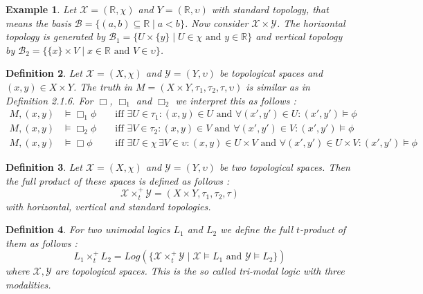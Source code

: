 \documentclass[12pt, a4paper]{scrartcl}
\newtheorem{definition}{Definition}[subsection]
\newtheorem{example}[definition]{Example}
\begin{document}
\begin{example}
    Let $\mathcal{X} = (\mathbb{R}, \chi)$ and $Y = (\mathbb{R}, \upsilon)$ with standard topology, that means the basis $\mathcal{B} = \{(a,b) \subseteq \mathbb{R} \mid a < b\}$. Now consider $\mathcal{X} \times \mathcal{Y}$. 
    The horizontal topology is generated by $\mathcal{B}_1 = \{U \times \{y\} \mid U \in \chi \mbox{ and } y \in \mathbb{R}\}$ and vertical topology by 
    $\mathcal{B}_2 = \{\{x\} \times V \mid  x \in \mathbb{R} \mbox{ and }V \in \upsilon\}$.
\end{example}

\begin{definition}
    Let $\mathcal{X} = (X, \chi)$ and $\mathcal{Y} =(Y, \upsilon)$ be topological spaces and $(x,y) \in X \times Y$. The truth in $M = (X\times Y, \tau_1,\tau_2,\tau, \upsilon)$ is similar as in Definition 2.1.6.
    For $\Box$, $\Box_1$ and $\Box_2$ we interpret this as follows : 
    \begin{align*}
        M,(x,y) &\vDash \Box_1 \phi &&\text{ iff } \exists U \in \tau_1 : (x,y) \in U \mbox{ and } \forall(x',y') \in U : (x',y') \vDash \phi \\
        M,(x,y) &\vDash \Box_2 \phi &&\text{ iff } \exists V \in \tau_2 : (x,y) \in V \mbox{ and } \forall(x',y') \in V : (x',y') \vDash \phi \\
        M,(x,y) &\vDash \Box \phi &&\text{ iff } \exists U \in \chi \, \exists V \in \upsilon: (x,y) \in U \times V \mbox{ and } \forall(x',y') \in U \times V : (x',y') \vDash \phi
    \end{align*}

\end{definition}

\begin{definition}
    Let $\mathcal{X} = (X, \chi)$ and $\mathcal{Y} = (Y, \upsilon)$ be two topological spaces. Then the full product of these spaces is defined as follows :
    $$\mathcal{X} \times^+_t \mathcal{Y} = (X \times Y, \tau_1, \tau_2, \tau)$$
    with horizontal, vertical and standard topologies.
\end{definition}



\begin{definition}
    For two unimodal logics $L_1$ and $L_2$ we define the full $t$-product of them as follows :
    $$L_1 \times^+_t L_2 = Log(\{\mathcal{X} \times^+_t \mathcal{Y} \mid \mathcal{X} \vDash L_1 \mbox{ and } \mathcal{Y} \vDash L_2\})$$
    where $\mathcal{X},\mathcal{Y}$ are topological spaces. This is the so called tri-modal logic with three modalities.
\end{definition}
\end{document}
